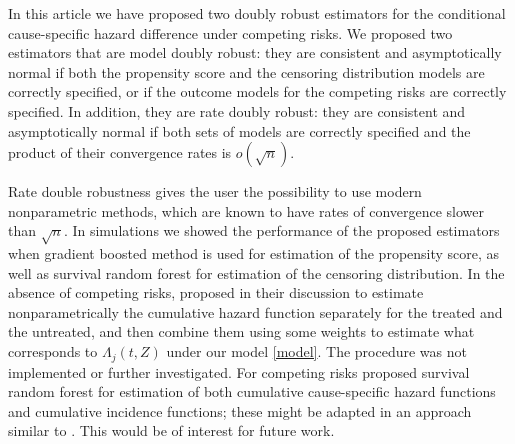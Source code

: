 \documentclass[11pt]{article}
\begin{document}

In this article we have proposed two doubly robust estimators for the conditional cause-specific hazard difference under competing risks.
We proposed two estimators that are model doubly robust: they are consistent and asymptotically normal if  both the propensity score  and the censoring distribution models are correctly specified,  or if the outcome models for the competing risks are correctly specified. In addition, they are rate doubly robust: they are consistent and asymptotically normal if both sets of models are correctly specified and the product of their convergence rates is $o(\sqrt{n})$. 

Rate double robustness 
gives the user the possibility
to use modern nonparametric methods, which are known to have rates of convergence slower than $\sqrt{n}$. In simulations we showed the performance of the proposed estimators when gradient boosted method is used for estimation of the propensity score, as well as 
 survival random forest for estimation of the censoring distribution. 
 In the absence of competing risks, \cite{hou2019estimating} proposed in their discussion to estimate nonparametrically the cumulative hazard function separately for the treated and the untreated, 
and then combine them using some weights to estimate what corresponds to $\Lambda_j(t,Z)$ under our model \eqref{model}. 
The procedure was not implemented or further investigated. 
For competing risks  \cite{ishwaran2014random} proposed survival random forest for estimation of both cumulative cause-specific hazard functions and cumulative incidence functions; these might be adapted in an approach similar to \cite{hou2019estimating}. This would be of interest for future work.
\end{document}
